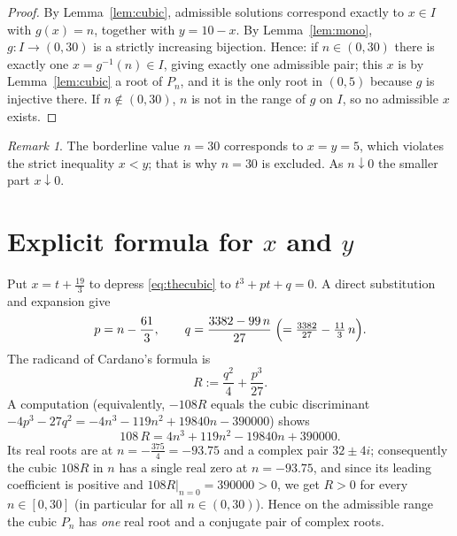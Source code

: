 \documentclass{amsart}
\theoremstyle{remark}
\newtheorem{remark}{Remark}
\begin{document}
\begin{proof}
By Lemma~\ref{lem:cubic}, admissible solutions correspond exactly to
$x\in I$ with $g(x)=n$, together with $y=10-x$. By Lemma~\ref{lem:mono},
$g\colon I\to(0,30)$ is a strictly increasing bijection. Hence:
if $n\in(0,30)$ there is exactly one $x=g^{-1}(n)\in I$, giving exactly one
admissible pair; this $x$ is by Lemma~\ref{lem:cubic} a root of $P_n$, and it is
the only root in $(0,5)$ because $g$ is injective there. If $n\notin(0,30)$,
$n$ is not in the range of $g$ on $I$, so no admissible $x$ exists.
\end{proof}

\begin{remark}
The borderline value $n=30$ corresponds to $x=y=5$, which violates the strict
inequality $x<y$; that is why $n=30$ is excluded. As $n\downarrow0$ the smaller
part $x\downarrow0$.
\end{remark}

\section{Explicit formula for \texorpdfstring{$x$}{x} and \texorpdfstring{$y$}{y}}

Put $x=t+\tfrac{19}{3}$ to depress \eqref{eq:thecubic} to $t^{3}+pt+q=0$.
A direct substitution and expansion give
\begin{equation}\label{eq:pq}
p=n-\frac{61}{3},
\qquad
q=\frac{3382-99\,n}{27}\;\Bigl(=\tfrac{3382}{27}-\tfrac{11}{3}\,n\Bigr).
\end{equation}
The radicand of Cardano's formula is
\[
R:=\frac{q^{2}}{4}+\frac{p^{3}}{27}.
\]
A computation (equivalently, $-108R$ equals the cubic discriminant
$-4p^{3}-27q^{2}=-4n^{3}-119n^{2}+19840n-390000$) shows
\[
108\,R=4n^{3}+119n^{2}-19840n+390000 .
\]
Its real roots are at $n=-\tfrac{375}{4}=-93.75$ and a complex pair
$32\pm 4i$; consequently the cubic $108R$ in $n$ has a single real zero at
$n=-93.75$, and since its leading coefficient is positive and
$108R\big|_{n=0}=390000>0$, we get $R>0$ for every $n\in[0,30]$ (in particular
for all $n\in(0,30)$). Hence on the admissible range the cubic $P_n$ has
\emph{one} real root and a conjugate pair of complex roots.
\end{document}
